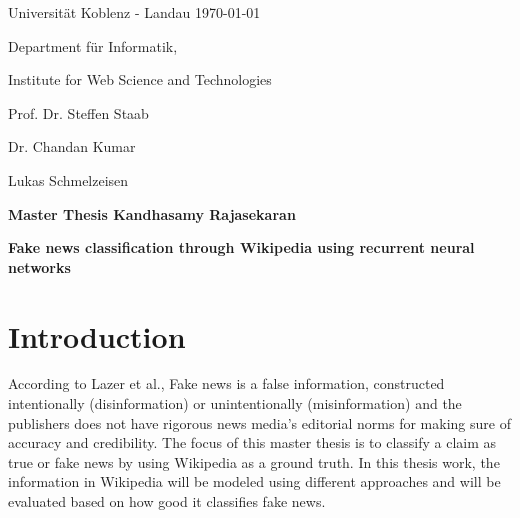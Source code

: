 \documentclass[a4paper, 11pt]{article}
\newcommand{\myName}{Kandhasamy Rajasekaran}
\newcommand{\Title}{Fake news classification through Wikipedia using recurrent neural networks}
\newcommand{\subject}{Institute for Web Science and Technologies}
\newcommand{\expert}{Prof. Dr. Steffen Staab}%
\newcommand{\supervisor}{Dr. Chandan Kumar} %
\newcommand{\secondSupervisor}{Lukas Schmelzeisen} %
\newcommand{\type}{Master Thesis}
\begin{document}
Universit\"{a}t Koblenz - Landau \hfill \today

Department f\"{u}r Informatik,

\subject{}

\expert{}

\supervisor{}

\secondSupervisor{}

\begin{center}
	\large{\bf \type{}  \myName{}}

	\vspace*{0.5cm}

	\large{\bf \Title}
\end{center}

\setlength{\parskip}{1.5ex plus0.5ex minus 0.5ex}
\section{Introduction}
\frenchspacing

According to Lazer et al.\cite{Lazer1094}, Fake news is a false information, constructed intentionally (disinformation) or unintentionally (misinformation) and the publishers does not have rigorous news media's editorial norms for making sure of accuracy and credibility. The focus of this master thesis is to classify a claim as true or fake news by using Wikipedia as a ground truth. In this thesis work, the information in Wikipedia will be modeled using different approaches and will be evaluated based on how good it classifies fake news.
\end{document}
